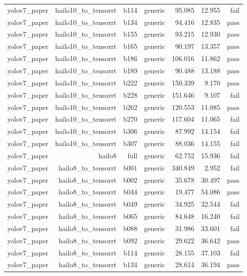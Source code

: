 \begin{table}[t]
\begin{tabular}{lrrrrrr}
yolov7\_paper & hailo10\_to\_tensorrt & b114 & generic & 95.085 & 12.955 & fail \\
yolov7\_paper & hailo10\_to\_tensorrt & b134 & generic & 94.416 & 12.835 & pass \\
yolov7\_paper & hailo10\_to\_tensorrt & b155 & generic & 93.215 & 12.930 & pass \\
yolov7\_paper & hailo10\_to\_tensorrt & b165 & generic & 90.197 & 13.357 & pass \\
yolov7\_paper & hailo10\_to\_tensorrt & b186 & generic & 106.016 & 11.862 & pass \\
yolov7\_paper & hailo10\_to\_tensorrt & b189 & generic & 90.488 & 13.188 & pass \\
yolov7\_paper & hailo10\_to\_tensorrt & b222 & generic & 150.339 & 9.170 & pass \\
yolov7\_paper & hailo10\_to\_tensorrt & b228 & generic & 151.646 & 9.107 & fail \\
yolov7\_paper & hailo10\_to\_tensorrt & b262 & generic & 120.553 & 11.085 & pass \\
yolov7\_paper & hailo10\_to\_tensorrt & b270 & generic & 117.604 & 11.065 & fail \\
yolov7\_paper & hailo10\_to\_tensorrt & b306 & generic & 87.992 & 14.154 & fail \\
yolov7\_paper & hailo10\_to\_tensorrt & b307 & generic & 88.036 & 14.155 & fail \\
yolov7\_paper & hailo8 & full & generic & 62.752 & 15.936 & fail \\
yolov7\_paper & hailo8\_to\_tensorrt & b001 & generic & 340.849 & 2.952 & fail \\
yolov7\_paper & hailo8\_to\_tensorrt & b002 & generic & 35.678 & 30.497 & pass \\
yolov7\_paper & hailo8\_to\_tensorrt & b044 & generic & 19.477 & 54.086 & pass \\
yolov7\_paper & hailo8\_to\_tensorrt & b049 & generic & 34.925 & 32.544 & fail \\
yolov7\_paper & hailo8\_to\_tensorrt & b065 & generic & 84.648 & 16.240 & fail \\
yolov7\_paper & hailo8\_to\_tensorrt & b088 & generic & 31.986 & 33.601 & fail \\
yolov7\_paper & hailo8\_to\_tensorrt & b092 & generic & 29.622 & 36.642 & pass \\
yolov7\_paper & hailo8\_to\_tensorrt & b114 & generic & 28.155 & 37.103 & fail \\
yolov7\_paper & hailo8\_to\_tensorrt & b134 & generic & 28.614 & 36.194 & pass \\

\end{tabular}
\end{table}
